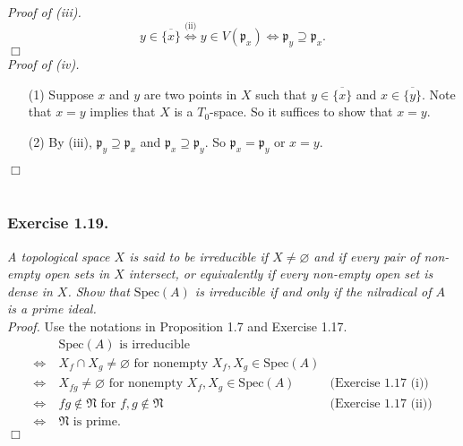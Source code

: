 \documentclass{article}
\begin{document}
\emph{Proof of (iii).}
  \[
    y \in \overline{\{x\}}
    \stackrel{\text{(ii)}}{\Longleftrightarrow}
    y \in V(\mathfrak{p}_x)
    \Longleftrightarrow
    \mathfrak{p}_y \supseteq \mathfrak{p}_x.
  \]
$\Box$ \\



\emph{Proof of (iv).}
\begin{enumerate}
\item[(1)]
  Suppose $x$ and $y$ are two points in $X$ such that $y \in \overline{\{x\}}$ and $x \in \overline{\{y\}}$.
  Note that $x = y$ implies that $X$ is a $T_0$-space.
  So it suffices to show that $x = y$.

\item[(2)]
  By (iii), $\mathfrak{p}_y \supseteq \mathfrak{p}_x$ and $\mathfrak{p}_x \supseteq \mathfrak{p}_y$.
  So $\mathfrak{p}_x = \mathfrak{p}_y$ or $x = y$.
\end{enumerate}
$\Box$ \\\\






\subsubsection*{Exercise 1.19.}
\emph{A topological space $X$ is said to be irreducible if
$X \neq \varnothing$ and if every pair of non-empty open sets in $X$ intersect, or
equivalently if every non-empty open set is dense in $X$.
Show that $\mathrm{Spec}(A)$ is irreducible if and only if
the nilradical of $A$ is a prime ideal.} \\

\emph{Proof.}
Use the notations in Proposition 1.7 and Exercise 1.17.
\begin{align*}
  & \: \text{$\mathrm{Spec}(A)$ is irreducible} \\
  \Longleftrightarrow& \:
  \text{$X_f \cap X_g \neq \varnothing$ for nonempty $X_f, X_g \in \mathrm{Spec}(A)$} \\
  \Longleftrightarrow& \:
  \text{$X_{fg} \neq \varnothing$ for nonempty $X_f, X_g \in \mathrm{Spec}(A)$}
    &\text{(Exercise 1.17 (i))} \\
  \Longleftrightarrow& \:
  \text{$fg \not\in \mathfrak{N}$ for $f,g \not\in \mathfrak{N}$}
    &\text{(Exercise 1.17 (ii))} \\
  \Longleftrightarrow& \:
  \text{$\mathfrak{N}$ is prime.}
\end{align*}
$\Box$ \\\\
\end{document}
